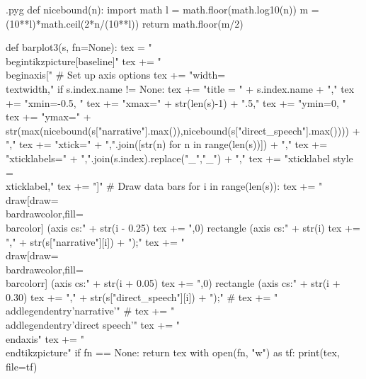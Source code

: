 \documentclass{report}
\makeatletter
\newenvironment{python}{%
  \VerbatimEnvironment
  \minted@resetoptions
  \setkeys{minted@opt}{}
      \begin{VerbatimOut}{\jobname.pyg}}
{%
      \end{VerbatimOut}
      \minted@pygmentize{python}
      \DeleteFile{\jobname.pyg}}
\makeatother
\begin{document}
\begin{python}
def nicebound(n):
    import math
    l = math.floor(math.log10(n))
    m = (10**l)*math.ceil(2*n/(10**l))
    return math.floor(m/2)

def barplot3(s, fn=None):
    tex = "\\begin{tikzpicture}[baseline]\n"
    tex += "\\begin{axis}[\n"
    # Set up axis options
    tex += "width=\\textwidth,\n"
    if s.index.name != None:
        tex += "title = " + s.index.name + ",\n"
    tex += "xmin=-0.5, "
    tex += "xmax=" + str(len(s)-1) + ".5,\n"
    tex += "ymin=0, "
    tex += "ymax=" + str(max(nicebound(s["narrative"].max()),nicebound(s["direct_speech"].max()))) + ",\n"
    tex += "xtick={" + ",".join([str(n) for n in range(len(s))]) + "},\n"
    tex += "xticklabels={" + ",".join(s.index).replace("_","\_") + "},\n"
    tex += "xticklabel style = {\\xticklabel},\n"
    tex += "]\n"
    # Draw data bars
    for i in range(len(s)):
        tex += "\\draw[draw=\\bardrawcolor,fill=\\barcolor] (axis cs:" + str(i - 0.25)
        tex += ",0) rectangle (axis cs:" + str(i)
        tex += "," + str(s["narrative"][i]) + ");\n"
        tex += "\\draw[draw=\\bardrawcolor,fill=\\barcolorr] (axis cs:" + str(i + 0.05)
        tex += ",0) rectangle (axis cs:" + str(i + 0.30)
        tex += "," + str(s["direct_speech"][i]) + ");\n"
#    tex += "\\addlegendentry{'narrative'}\n"
#    tex += "\\addlegendentry{'direct speech'}\n"
    tex += "\\end{axis}\n"
    tex += "\\end{tikzpicture}\n"
    if fn == None:
        return tex
    with open(fn, "w") as tf:
        print(tex, file=tf)

\end{python}
\end{document}
